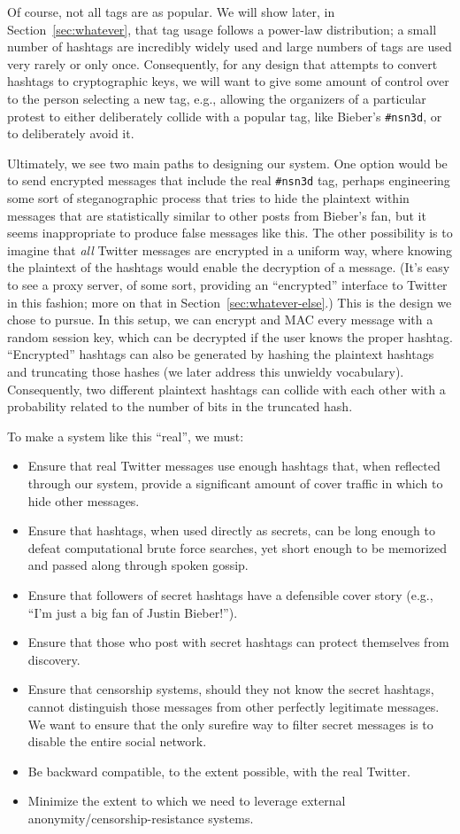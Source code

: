 Of course, not all tags are as popular. We will show later, in Section~\ref{sec:whatever}, that tag usage follows a power-law distribution; a small number of hashtags are incredibly widely used and large numbers of tags are used very rarely or only once. Consequently, for any design that attempts to convert hashtags to cryptographic keys, we will want to give some amount of control over to the person selecting a new tag, e.g., allowing the organizers of a particular protest to either deliberately collide with a popular tag, like Bieber's {\tt #nsn3d}, or to deliberately avoid it.

Ultimately, we see two main paths to designing our system. One option would be to send encrypted messages that include the real {\tt #nsn3d} tag, perhaps engineering some sort of steganographic process that tries to hide the plaintext within messages that are statistically similar to other posts from Bieber's fan, but it seems inappropriate to produce false messages like this. The other possibility is to imagine that {\em all} Twitter messages are encrypted in a uniform way, where knowing the plaintext of the hashtags would enable the decryption of a message. (It's easy to see a proxy server, of some sort, providing an ``encrypted'' interface to Twitter in this fashion; more on that in Section~\ref{sec:whatever-else}.) This is the design we chose to pursue. In this setup, we can encrypt and MAC every message with a random session key, which can be decrypted if the user knows the proper hashtag. ``Encrypted'' hashtags can also be generated by hashing the plaintext hashtags and truncating those hashes (we later address this unwieldy vocabulary). Consequently, two different plaintext hashtags can collide with each other with a probability related to the number of bits in the truncated hash.

To make a system like this ``real'', we must:
\begin{itemize}
\item Ensure that real Twitter messages use enough hashtags that, when reflected through our system, provide a significant amount of cover traffic in which to hide other messages.
\item Ensure that hashtags, when used directly as secrets, can be long enough to defeat computational brute force searches, yet short enough to be memorized and passed along through spoken gossip.
\item Ensure that followers of secret hashtags have a defensible cover story (e.g., ``I'm just a big fan of Justin Bieber!'').
\item Ensure that those who post with secret hashtags can protect themselves from discovery.
\item Ensure that censorship systems, should they not know the secret hashtags, cannot distinguish those messages from other perfectly legitimate messages. We want to ensure that the only surefire way to filter secret messages is to disable the entire social network.
\item Be backward compatible, to the extent possible, with the real Twitter.
\item Minimize the extent to which we need to leverage external anonymity/censorship-resistance systems.
\end{itemize}

